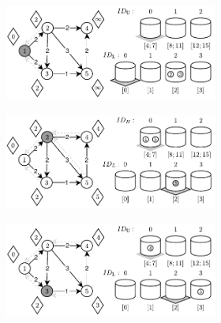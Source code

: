 \begin{figure}[!htbp]
	\ContinuedFloat
	\centering
	\begin{subfigure}[b]{\textwidth}
		\null\hfill
		\begin{subfigure}[b]{0.495\textwidth}
			\includegraphics[width=\textwidth]{Chapter_II/DOUBLE-LEVEL-BUCKET-Example/b.pdf}
			\caption{}
			\label{fig:exampleDoubleLevelBuckets:b}
		\end{subfigure}
		\hfill
		\begin{subfigure}[b]{0.495\textwidth}
			\includegraphics[width=\textwidth]{Chapter_II/DOUBLE-LEVEL-BUCKET-Example/c.pdf}
			\caption{}
			\label{fig:exampleDoubleLevelBuckets:c}
		\end{subfigure}
		\hfill\null
	\end{subfigure}
	\begin{subfigure}[b]{\textwidth}
		\null\hfill
		\begin{subfigure}[b]{0.495\textwidth}
			\includegraphics[width=\textwidth]{Chapter_II/DOUBLE-LEVEL-BUCKET-Example/d.pdf}

\end{subfigure}
\end{subfigure}
\end{figure}
